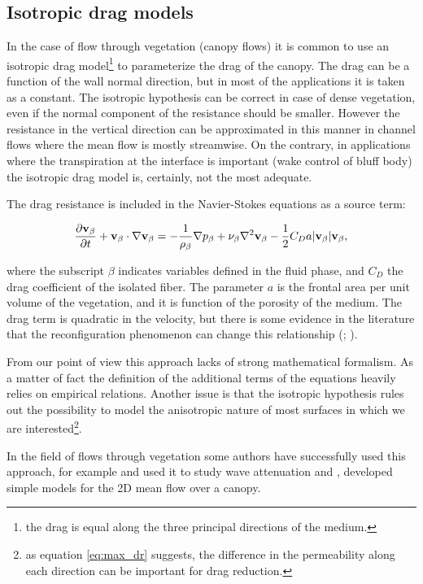 \subsection{Isotropic drag models}
\label{sec:canopy_eq}

In the case of flow through vegetation (canopy flows) it is common to use an isotropic drag model\footnote{the drag is equal along the three principal directions of the medium.} to parameterize the drag of the canopy.
The drag can be a function of the wall normal direction, but in most of the applications it is taken as a constant.
The isotropic hypothesis can be correct in case of dense vegetation, even if the normal component of the resistance should be smaller.
However the resistance in the vertical direction can be approximated in this manner in channel flows where the mean flow is mostly streamwise. On the contrary, in applications where the transpiration at the interface is important (wake control of bluff body) the isotropic drag model is, certainly, not the most adequate.

The drag resistance is included in the Navier-Stokes equations as a source term:

\begin{equation}
\dfrac{\partial \textbf{v}_{\beta}}{\partial t} + \textbf{v}_{\beta} \cdot \nabla \textbf{v}_{\beta} = -\frac{1}{\rho_{\beta}} \nabla p_{\beta} + \nu_{\beta} \nabla^2 \textbf{v}_{\beta} - \dfrac{1}{2} C_D a |\textbf{v}_{\beta}| \textbf{v}_{\beta}, 
\label{eq:mom_cd}
\end{equation}

where the subscript $\beta$ indicates variables defined in the fluid phase, and $C_D$ the drag coefficient of the isolated fiber.
The parameter $a$ is the frontal area per unit volume of the vegetation, and it is function of the porosity of the medium.
The drag term is quadratic in the velocity, but there is some evidence in the literature that the reconfiguration phenomenon can change this relationship (\citet{gosselin2011drag}; \citet{alvarado2017nature}).

From our point of view this approach lacks of strong mathematical formalism. As a matter of fact the definition of the additional terms of the equations heavily relies on empirical relations.
Another issue is that the isotropic hypothesis rules out the possibility to model the anisotropic nature of most surfaces in which we are interested\footnote{as equation \eqref{eq:max_dr} suggests, the difference in the permeability along each direction can be important for drag reduction.}.

In the field of flows through vegetation some authors have successfully used this approach, for example \citet{maza2013coupled} and \citet{maza2015tsunami} used it to study wave attenuation and \citet{ghisalberti2004limited}, \citet{battiato2014single} developed simple models for the 2D mean flow over a canopy.


